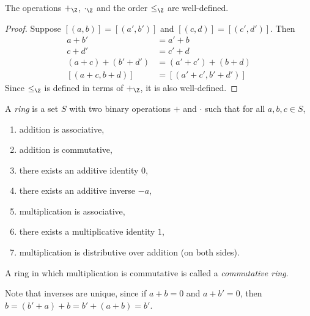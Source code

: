 \begin{proposition}
    The operations $+_\Z$, $\cdot_\Z$ and the order $\leq_\Z$ are well-defined.
\end{proposition}
\begin{proof}
    Suppose $[(a, b)] = [(a', b')]$ and $[(c, d)] = [(c', d')]$.
    Then \begin{align*}
        a + b' &= a' + b \\
        c + d' &= c' + d \\
        (a + c) + (b' + d') &= (a' + c') + (b + d) \\
        [(a + c, b + d)] &= [(a' + c', b' + d')]
    \end{align*}
    Since $\le_\Z$ is defined in terms of $+_\Z$, it is also well-defined.
\end{proof}

\begin{definition}[Ring] \label{def:ring}
    A \emph{ring} is a set $S$ with two binary operations $+$ and $\cdot$ such
    that for all $a, b, c \in S$,
    \begin{enumerate}
        \item addition is associative,
        \item addition is commutative,
        \item there exists an additive identity $0$,
        \item there exists an additive inverse $-a$,
        \item multiplication is associative,
        \item there exists a multiplicative identity $1$,
        \item multiplication is distributive over addition (on both sides).
    \end{enumerate}
    A ring in which multiplication is commutative is called a
    \emph{commutative ring}.
\end{definition}
Note that inverses are unique, since if $a + b = 0$ and $a + b' = 0$, then
$b = (b' + a) + b = b' + (a + b) = b'$.

